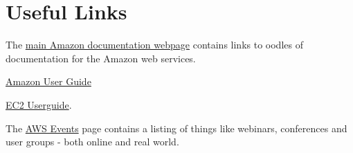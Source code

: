 \section{Useful Links}

The \href{http://docs.amazonwebservices.com}{main Amazon documentation webpage} contains links to oodles of documentation for the Amazon web services.

\href{http://docs.amazonwebservices.com/AWSEC2/latest/UserGuide/}{Amazon User Guide}

\href{http://docs.amazonwebservices.com/AWSEC2/latest/GettingStartedGuide/}{EC2 Userguide}. 

The \href{https://aws.amazon.com/about-aws/events/}{AWS Events} page contains a listing of things like webinars, conferences and user groups - both online and real world.
